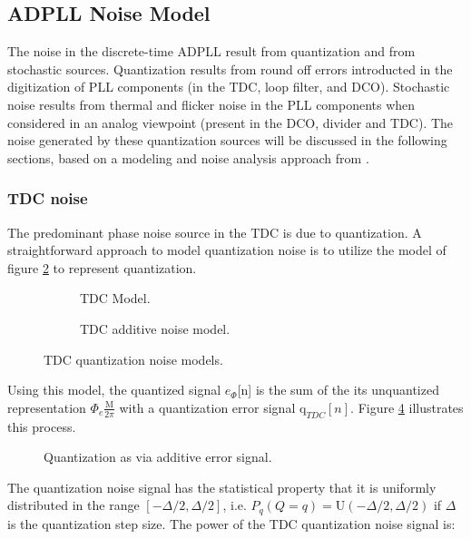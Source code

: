 \subsection{ADPLL Noise Model} \label{pn_theory}
The noise in the discrete-time ADPLL result from quantization and from stochastic sources. Quantization results from round off errors introducted in the digitization of PLL components (in the TDC, loop filter, and DCO). Stochastic noise results from thermal and flicker noise in the PLL components when considered in an analog viewpoint (present in the DCO, divider and TDC). The noise generated by these quantization sources will be discussed in the following sections, based on a modeling and noise analysis approach from \cite{perrott_2002}.

\subsubsection{TDC noise}\label{tdc_noise}
	The predominant phase noise source in the TDC is due to quantization. A straightforward approach to model quantization noise is to utilize the model of figure \ref{fig:tdc_add_pn} to represent quantization.
	\begin{figure}[htb!]
	    \centering
	    \begin{subfigure}{0.5\textwidth}
	        \centering
	        
	        \caption{TDC Model.}
	        \label{fig:tdc1}
	    \end{subfigure}%
	    \begin{subfigure}{0.5\textwidth}
	        \centering
	        
	        \caption{TDC additive noise model.}
	        \label{fig:tdc_add_pn}
	    \end{subfigure}
	    \label{fig:tdc_pn_model}
	    \caption{TDC quantization noise models.}
	\end{figure}
	\FloatBarrier
	Using this model, the quantized signal $e_\Phi$[n] is the sum of the its unquantized representation $\Phi_e\frac{\mathrm{M}}{2\pi}$ with a quantization error signal $\mathrm{q}_{TDC}[n]$. Figure \ref{fig:quantization} illustrates this process.
	\begin{figure}[htb!]
		\center
		\caption{Quantization as via additive error signal.}
		\label{fig:quantization}
	\end{figure}
	\FloatBarrier
	The quantization noise signal has the statistical property that it is uniformly distributed in the range $[-\Delta/2, \Delta/2]$, i.e. $P_q(Q=q) =\mathrm{U}(-\Delta/2, \Delta/2)$ if $\Delta$ is the quantization step size. The power of the TDC quantization noise signal is:
